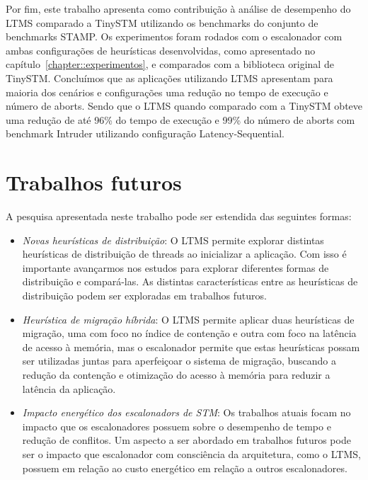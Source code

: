 \documentclass[diss,capa]{texufpel}
\begin{document}
Por fim, este trabalho apresenta como contribuição à análise de desempenho do LTMS comparado a TinySTM utilizando os benchmarks do conjunto de benchmarks STAMP. Os experimentos foram rodados com o escalonador com ambas configurações de heurísticas desenvolvidas, como apresentado no capítulo~\ref{chapter::experimentos}, e comparados com a biblioteca original de TinySTM. Concluímos que as aplicações utilizando LTMS apresentam para maioria dos cenários e configurações uma redução no tempo de execução e número de aborts. Sendo que o LTMS quando comparado com a TinySTM obteve uma redução de até 96\% do tempo de execução e 99\% do número de aborts com benchmark Intruder utilizando configuração Latency-Sequential.

\section{\textbf{Trabalhos futuros}}

A pesquisa apresentada neste trabalho pode ser estendida das seguintes formas:

\begin{itemize}
 \item \emph{Novas heurísticas de distribuição}: O LTMS permite explorar distintas heurísticas de distribuição de threads ao inicializar a aplicação. Com isso é importante avançarmos nos estudos para explorar diferentes formas de distribuição e compará-las. As distintas características entre as heurísticas de distribuição podem ser exploradas em trabalhos futuros. 

 \item \emph{Heurística de migração híbrida}: O LTMS permite aplicar duas heurísticas de migração, uma com foco no índice de contenção e outra com foco na latência de acesso à memória, mas o escalonador permite que estas heurísticas possam ser utilizadas juntas para aperfeiçoar o sistema de migração, buscando a redução da contenção e otimização do acesso à memória para reduzir a latência da aplicação.

 \item \emph{Impacto energético dos escalonadors de STM}: Os trabalhos atuais focam no impacto que os escalonadores possuem sobre o desempenho de tempo e redução de conflitos. Um aspecto a ser abordado em trabalhos futuros pode ser o impacto que escalonador com consciência da arquitetura, como o LTMS, possuem em relação ao custo energético em relação a outros escalonadores.
\end{itemize}
\end{document}
